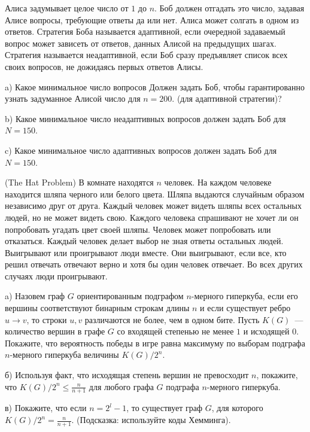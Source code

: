\setcounter{curtask}{51}


\begin{task}
	Алиса задумывает целое число от $1$ до $n$. Боб должен отгадать это число,
    задавая Алисе вопросы, требующие ответы да или нет. Алиса может солгать в одном
    из ответов. Стратегия Боба называется адаптивной, если очередной задаваемый
    вопрос может зависеть от ответов, данных Алисой на предыдущих шагах. Стратегия
    называется неадаптивной, если Боб сразу предъявляет список всех своих вопросов,
    не дожидаясь первых ответов Алисы.

	a) Какое минимальное число вопросов Должен задать Боб, чтобы гарантированно
    узнать задуманное Алисой число для $n = 200$. (для адаптивной стратегии)?
    
	b) Какое минимальное число неадаптивных вопросов должен задать Боб для $N = 150$.
    
	c) Какое минимальное число адаптивных вопросов должен задать Боб для $N = 150$.
\end{task}

\begin{task} (The Hat Problem)
    В комнате находятся $n$ человек. На каждом человеке находится шляпа черного или
    белого цвета. Шляпа выдаются случайным образом независимо друг от друга. Каждый
    человек может видеть шляпы всех остальных людей, но не может видеть свою. Каждого
    человека спрашивают не хочет ли он попробовать угадать цвет своей шляпы. Человек
    может попробовать или отказаться. Каждый человек делает выбор не зная ответы
    остальных людей. Выигрывают или проигрывают люди вместе. Они выигрывают, если
    все, кто решил отвечать отвечают верно и хотя бы один человек отвечает. Во всех
    других случаях люди проигрывают.

	a) Назовем граф $G$ ориентированным подграфом $n$-мерного гиперкуба, если его
    вершины соответствуют бинарным строкам длины $n$ и если существует ребро $u
    \rightarrow v$, то строки $u, v$ различаются не более, чем в одном бите. Пусть
    $K(G)$~--- количество вершин в графе $G$ со входящей степенью не менее $1$ и
    исходящей $0$. Покажите, что вероятность победы в игре равна максимуму по выборам
    подграфа $n$-мерного гиперкуба величины $K(G) / 2^n$.

    б) Используя факт, что исходящая степень вершин не превосходит $n$, покажите, что
    $K(G) / 2^n \le \frac{n}{n + 1}$ для любого графа $G$ подграфа $n$-мерного
    гиперкуба.

    в) Покажите, что если $n = 2^l - 1$, то существует граф $G$, для которого
	$K(G) / 2^n = \frac{n}{n + 1}$. (Подсказка: используйте коды Хемминга).
\end{task}

